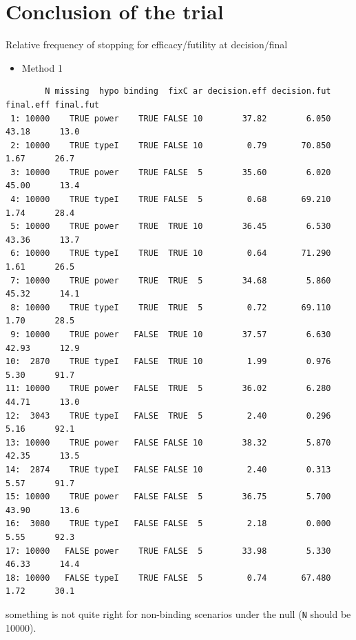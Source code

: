 \documentclass[12pt]{article}
\newcommand\Warning[1][3ex]{%
\renewcommand\stacktype{L}%
\scaleto{\stackon[1.3pt]{\color{red}$\triangle$}{\tiny\bfseries !}}{#1}%
\xspace
}
\begin{document}
\clearpage

\section{Conclusion of the trial}
\label{sec:org64690ee}

Relative frequency of stopping for efficacy/futility at decision/final

\begin{itemize}
\item Method 1
\end{itemize}
\begin{verbatim}
        N missing  hypo binding  fixC ar decision.eff decision.fut final.eff final.fut
 1: 10000    TRUE power    TRUE FALSE 10        37.82        6.050     43.18      13.0
 2: 10000    TRUE typeI    TRUE FALSE 10         0.79       70.850      1.67      26.7
 3: 10000    TRUE power    TRUE FALSE  5        35.60        6.020     45.00      13.4
 4: 10000    TRUE typeI    TRUE FALSE  5         0.68       69.210      1.74      28.4
 5: 10000    TRUE power    TRUE  TRUE 10        36.45        6.530     43.36      13.7
 6: 10000    TRUE typeI    TRUE  TRUE 10         0.64       71.290      1.61      26.5
 7: 10000    TRUE power    TRUE  TRUE  5        34.68        5.860     45.32      14.1
 8: 10000    TRUE typeI    TRUE  TRUE  5         0.72       69.110      1.70      28.5
 9: 10000    TRUE power   FALSE  TRUE 10        37.57        6.630     42.93      12.9
10:  2870    TRUE typeI   FALSE  TRUE 10         1.99        0.976      5.30      91.7
11: 10000    TRUE power   FALSE  TRUE  5        36.02        6.280     44.71      13.0
12:  3043    TRUE typeI   FALSE  TRUE  5         2.40        0.296      5.16      92.1
13: 10000    TRUE power   FALSE FALSE 10        38.32        5.870     42.35      13.5
14:  2874    TRUE typeI   FALSE FALSE 10         2.40        0.313      5.57      91.7
15: 10000    TRUE power   FALSE FALSE  5        36.75        5.700     43.90      13.6
16:  3080    TRUE typeI   FALSE FALSE  5         2.18        0.000      5.55      92.3
17: 10000   FALSE power    TRUE FALSE  5        33.98        5.330     46.33      14.4
18: 10000   FALSE typeI    TRUE FALSE  5         0.74       67.480      1.72      30.1
\end{verbatim}
\Warning something is not quite right for non-binding scenarios under the null (\texttt{N} should be 10000).

\clearpage
\end{document}
